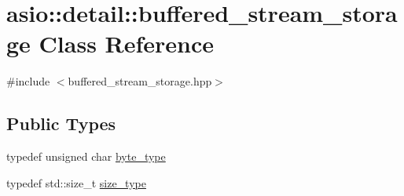 \hypertarget{classasio_1_1detail_1_1buffered__stream__storage}{}\section{asio\+:\+:detail\+:\+:buffered\+\_\+stream\+\_\+storage Class Reference}
\label{classasio_1_1detail_1_1buffered__stream__storage}


{\ttfamily \#include $<$buffered\+\_\+stream\+\_\+storage.\+hpp$>$}

\subsection*{Public Types}
\begin{DoxyCompactItemize}
\item 
typedef unsigned char \hyperlink{classasio_1_1detail_1_1buffered__stream__storage_a8c60fd3097ec6de528a228a91d671f9d}{byte\+\_\+type}
\item 
typedef std\+::size\+\_\+t \hyperlink{classasio_1_1detail_1_1buffered__stream__storage_a1307072f53f7298ff9ce12e1d1f483cf}{size\+\_\+type}
\end{DoxyCompactItemize}
